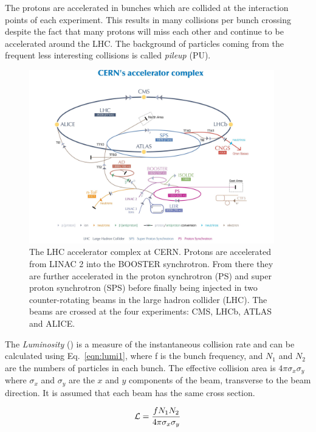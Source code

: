 The protons are accelerated in bunches which are collided at the interaction points of each experiment. This results in many collisions per bunch crossing despite the fact that many protons will miss each other and continue to be accelerated around the LHC. The background of particles coming from the frequent less interesting collisions is called \emph{pileup} (PU).

\begin{figure}[ht!]
\centering
    \includegraphics[width=0.95\textwidth]{images/LHCacc.jpg}
    \caption{The LHC accelerator complex at CERN. Protons are accelerated from LINAC 2 into the BOOSTER synchrotron. From there they are further accelerated in the proton synchrotron (PS) and super proton synchrotron (SPS) before finally being injected in two counter-rotating beams in the large hadron collider (LHC). The beams are crossed at the four experiments: CMS, LHCb, ATLAS and ALICE.}
    \label{fig:LHC acc}
\end{figure}


The \emph{Luminosity} (\lumi) is a measure of the instantaneous collision rate and can be calculated using Eq.~\ref{eqn:lumi1}, where f is the bunch frequency, and $N_1$ and $N_2$ are the numbers of particles in each bunch. The effective collision area is $4\pi\sigma_{x}\sigma_{y}$ where $\sigma_{x}$ and $\sigma_{y}$ are the $x$ and $y$ components of the beam, transverse to the beam direction. It is assumed that each beam has the same cross section.

\begin{equation}
\mathcal{L} = \frac{f{N}_{1}{N}_{2}}{4\pi\sigma_{x}\sigma_{y}}
\label{eqn:lumi1}
\end{equation}

